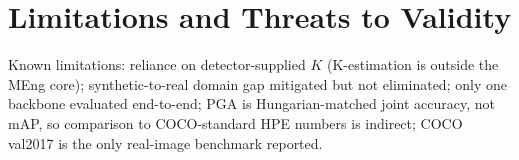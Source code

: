 \section{Limitations and Threats to Validity}
\label{sec_disc_limits}

Known limitations: reliance on detector-supplied $K$ (K-estimation is outside the MEng core); synthetic-to-real domain gap mitigated but not eliminated; only one backbone evaluated end-to-end; PGA is Hungarian-matched joint accuracy, not mAP, so comparison to COCO-standard HPE numbers is indirect; COCO val2017 is the only real-image benchmark reported.

